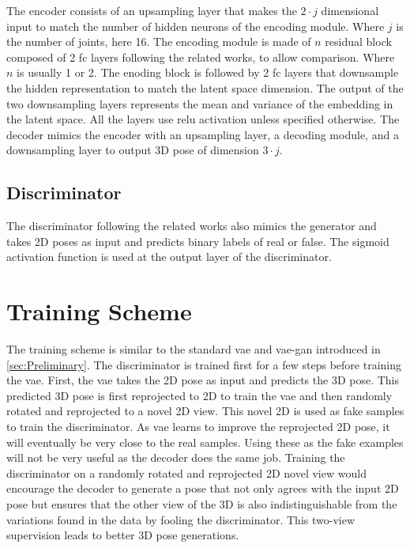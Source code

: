 The encoder consists of an upsampling layer that makes the $2 \cdot j$ dimensional input to match the number of hidden neurons of the encoding module. Where $j$ is the number of joints, here 16. The encoding module is made of $n$ residual block composed of 2 \ac{fc} layers following the related works, to allow comparison. Where $n$ is usually 1 or 2. The enoding block is followed by 2 \ac{fc} layers that downsample the hidden representation to match the latent space dimension. The output of the two downsampling layers represents the mean and variance of the embedding in the latent space. All the layers use \ac{relu} activation unless specified otherwise. The decoder mimics the encoder with an upsampling layer, a decoding module, and a downsampling layer to output 3D pose of dimension $3 \cdot j$.

\subsection{Discriminator}%
The discriminator following the related works also mimics the generator and takes 2D poses as input and predicts binary labels of real or false. The sigmoid activation function is used at the output layer of the discriminator.


\section{Training Scheme}
The training scheme is similar to the standard \ac{vae} and \ac{vae}-\ac{gan} introduced in \ref{sec:Preliminary}. The discriminator is trained first for a few steps before training the \ac{vae}. First, the \ac{vae} takes the 2D pose as input and predicts the 3D pose. This predicted 3D pose is first reprojected to 2D to train the \ac{vae} and then randomly rotated and reprojected to a novel 2D view. This novel 2D is used as fake samples to train the discriminator. As \ac{vae} learns to improve the reprojected 2D pose, it will eventually be very close to the real samples. Using these as the fake examples will not be very useful as the decoder does the same job. Training the discriminator on a randomly rotated and reprojected 2D novel view would encourage the decoder to generate a pose that not only agrees with the input 2D pose but ensures that the other view of the 3D is also indistinguishable from the variations found in the data by fooling the discriminator. This two-view supervision leads to better 3D pose generations.

